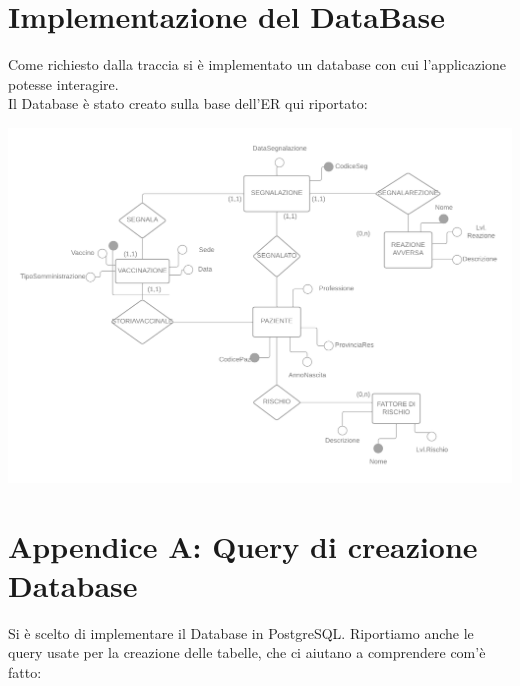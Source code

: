 \documentclass{article}
\begin{document}
\section{Implementazione del DataBase}
Come richiesto dalla traccia si è implementato un database con cui l'applicazione potesse interagire.\\
Il Database è stato creato sulla base dell'ER qui riportato:
\begin{center}
    \includegraphics[width=1\textwidth]{pictures/_Diagramma vuoto.png}
\end{center}

\newpage
\section*{Appendice A: Query di creazione Database}

Si è scelto di implementare il Database in PostgreSQL. Riportiamo anche le query usate per la creazione delle tabelle, che ci aiutano a comprendere com'è fatto:
\end{document}
